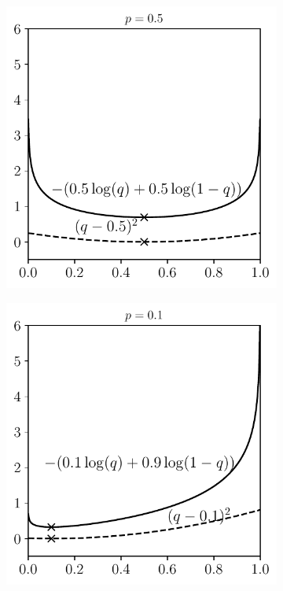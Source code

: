 \begin{figure}[t]
\begin{subfigure}{0.325\textwidth}
\includegraphics[width=0.99\linewidth]{Chapters/05_NeuralNetworks/13_softmax/crossentropy1.pdf}
\caption{}
\end{subfigure}
\begin{subfigure}{0.325\textwidth}
\includegraphics[width=0.99\linewidth]{Chapters/05_NeuralNetworks/13_softmax/crossentropy2.pdf}

\end{subfigure}
\end{figure}
